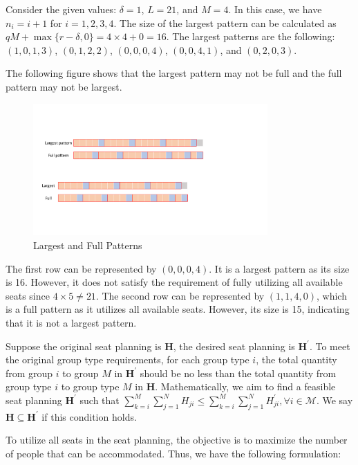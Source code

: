 \begin{example}
Consider the given values: $\delta = 1$, $L = 21$, and $M = 4$. In this case, we have $n_i = i + 1$ for $i = 1, 2, 3, 4$. The size of the largest pattern can be calculated as $qM + \max\{r-\delta, 0\} = 4 \times 4 + 0 = 16$. The largest patterns are the following: $(1, 0, 1, 3)$, $(0, 1, 2, 2)$, $(0, 0, 0, 4)$, $(0, 0, 4, 1)$, and $(0, 2, 0, 3)$.

The following figure shows that the largest pattern may not be full and the full pattern may not be largest.
\begin{figure}[ht]
    \centering
        \includegraphics[width=0.8\textwidth]{./Figures/full.pdf}
    \caption{Largest and Full Patterns}
\end{figure}

The first row can be represented by $(0, 0, 0, 4)$. It is a largest pattern as its size is 16. However, it does not satisfy the requirement of fully utilizing all available seats since $4 \times 5 \neq 21$.
The second row can be represented by $(1, 1, 4, 0)$, which is a full pattern as it utilizes all available seats. However, its size is 15, indicating that it is not a largest pattern.
\end{example}


Suppose the original seat planning is $\bm{H}$, the desired seat planning is $\bm{H}^{\prime}$. To meet the original group type requirements, for each group type $i$, the total quantity from group $i$ to group $M$ in $\bm{H}^{\prime}$ should be no less than the total quantity from group type $i$ to group type $M$ in $\bm{H}$. Mathematically, we aim to find a feasible seat planning $\bm{H}^{\prime}$ such that $\sum_{k=i}^{M} \sum_{j=1}^{N} H_{ji} \leq \sum_{k=i}^{M} \sum_{j=1}^{N} H^{'}_{ji}, \forall i \in \mathcal{M}$. We say $\bm{H} \subseteq \bm{H}^{'}$ if this condition holds.

To utilize all seats in the seat planning, the objective is to maximize the number of people that can be accommodated. Thus, we have the following formulation:


